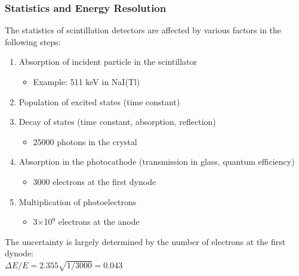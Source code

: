 \subsubsection{Statistics and Energy Resolution}
The statistics of scintillation detectors are affected by various factors in the following steps:
\begin{enumerate}
    \item Absorption of incident particle in the scintillator
    \begin{itemize}
        \item[] Example: 511 keV in NaI(Tl)
    \end{itemize}
    \item Population of excited states (time constant)
    \item Decay of states (time constant, absorption, reflection)
    \begin{itemize}
        \item[] 25000 photons in the crystal
    \end{itemize}
    \item Absorption in the photocathode (transmission in glass, quantum efficiency)
    \begin{itemize}
        \item[] 3000 electrons at the first dynode
    \end{itemize}
    \item Multiplication of photoelectrons
    \begin{itemize}
        \item[] 3$\times$10$^9$ electrons at the anode
    \end{itemize}
\end{enumerate}
The uncertainty is largely determined by the number of electrons at the first dynode:\\
$\Delta E/E=2.355\sqrt{1/3000}=0.043$

